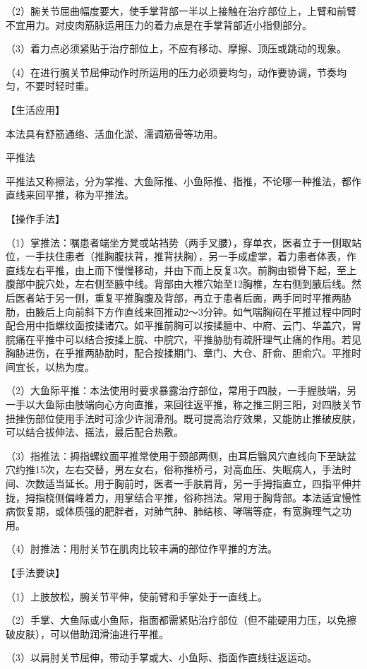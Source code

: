 \documentclass[12pt,UTF8,openany]{ctexbook}
\begin{document}
（2）腕关节屈曲幅度要大，使手掌背部一半以上接触在治疗部位上，上臂和前臂不宜用力。对皮肉筋脉运用压力的着力点是在手掌背部近小指侧部分。

（3）着力点必须紧贴于治疗部位上，不应有移动、摩擦、顶压或跳动的现象。

（4）在进行腕关节屈伸动作时所运用的压力必须要均匀，动作要协调，节奏均匀，不要时轻时重。

【生活应用】

本法具有舒筋通络、活血化淤、濡调筋骨等功用。

平推法

平推法又称擦法，分为掌推、大鱼际推、小鱼际推、指推，不论哪一种推法，都作直线来回平推，称为平推法。

【操作手法】

（1）掌推法：嘱患者端坐方凳或站裆势（两手叉腰），穿单衣，医者立于一侧取站位，一手扶住患者（推胸腹扶背，推背扶胸），另一手成虚掌，着力患者体表，作直线左右平推，由上而下慢慢移动，并由下而上反复3次。前胸由锁骨下起，至上腹部中脘穴处，左右侧至腋中线。背部由大椎穴始至12胸椎，左右侧到腋后线。然后医者站于另一侧，重复平推胸腹及背部，再立于患者后面，两手同时平推两胁肋，由腋后上向前斜下方作直线来回推动2～3分钟。如气喘胸闷在平推过程中同时配合用中指螺纹面按揉诸穴。如平推前胸可以按揉膻中、中府、云门、华盖穴，胃脘痛在平推中可以结合按揉上脘、中脘穴，平推胁肋有疏肝理气止痛的作用。若见胸胁进伤，在乎推两胁肋时，配合按揉期门、章门、大仓、肝俞、胆俞穴。平推时间宜长，以热为度。

（2）大鱼际平推：本法使用时要求暴露治疗部位，常用于四肢，一手握肢端，另一手以大鱼际由肢端向心方向直推，来回往返平推，称之推三阴三阳，对四肢关节扭挫伤部位使用手法时可涂少许润滑剂。既可提高治疗效果，又能防止推破皮肤，可以结合拔伸法、摇法，最后配合热敷。

（3）指推法：拇指螺纹面平推常使用于颈部两侧，由耳后翳风穴直线向下至缺盆穴约推15次，左右交替，男左女右，俗称推桥弓，对高血压、失眠病人，手法时间、次数适当延长。用于胸前时，医者一手肤肩背，另一手拇指直立，四指平伸并拢，拇指桡侧偏峰着力，用掌结合平推，俗称挡法。常用于胸背部。本法适宜慢性病恢复期，或体质强的肥胖者，对肺气肿、肺结核、哮喘等症，有宽胸理气之功用。

（4）肘推法：用肘关节在肌肉比较丰满的部位作平推的方法。

【手法要诀】

（1）上肢放松，腕关节平伸，使前臂和手掌处于一直线上。

（2）手掌、大鱼际或小鱼际，指面都需紧贴治疗部位（但不能硬用力压，以免擦破皮肤），可以借助润滑油进行平推。

（3）以肩肘关节屈伸，带动手掌或大、小鱼际、指面作直线往返运动。
\end{document}
